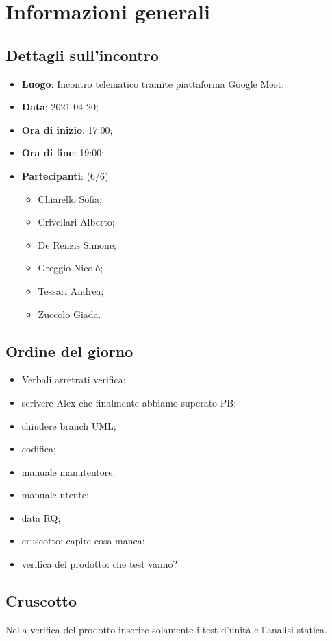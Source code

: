 \section{Informazioni generali}

\subsection{Dettagli sull'incontro}
\begin{itemize}
\item \textbf{Luogo}: Incontro telematico tramite piattaforma Google Meet;
\item \textbf{Data}: 2021-04-20;
\item \textbf{Ora di inizio}: 17:00;
\item \textbf{Ora di fine}: 19:00;
\item \textbf{Partecipanti}: (6/6) 
\begin{itemize}
	\item Chiarello Sofia;
	\item Crivellari Alberto;
	\item De Renzis Simone;
	\item Greggio Nicolò;
	\item Tessari Andrea;
	\item Zuccolo Giada.
\end{itemize}
\end{itemize}

\subsection{Ordine del giorno}
\begin{itemize}
	\item Verbali arretrati verifica;
	
	\item scrivere Alex che finalmente abbiamo superato PB;
	
	\item chiudere branch UML;
	
	\item codifica;
	
	\item manuale manutentore;
	
	\item manuale utente;
	
	\item data RQ;
	
	\item cruscotto: capire cosa manca;
	
	\item verifica del prodotto: che test vanno?
\end{itemize}

\subsection{Cruscotto}
Nella verifica del prodotto inserire solamente i test d'unità e l'analisi statica.


